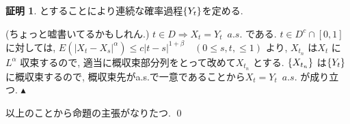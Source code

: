 \documentclass[10pt, fleqn, label-section=none]{bxjsarticle}
\theoremstyle{definition}
\newtheorem*{pf*}{証明}
\newcommand{\cbra}[1]{\mleft\{#1\mright\}}
\newcommand{\abs}[1]{\left|#1\right|}
\newcommand{\naraba}{\Rightarrow}
\renewcommand{\;}{\, ; \,}
\newenvironment{claim}[1]{\par\noindent\underline{step:}\space#1}{}
\newenvironment{claimproof}[1]{\par\noindent{($\because$)}\space#1}{\hfill $\blacktriangle $}
\begin{document}
\begin{pf*}
とすることにより連続な確率過程$\cbra{Y_t}$を定める.
\begin{claimproof}(ちょっと嘘書いてるかもしれん.)
$t \in D \naraba X_t = Y_t \,\,\, a.s.$ である. $t \in D^c \cap [0,1]$ に対しては, $E(\abs{X_t - X_s}^\alpha) \leq c \abs{t -s} ^{1 + \beta} \quad (0 \leq s,t, \leq 1)$ より, $X_{t_n}$ は$X_t$ に$L^\alpha$ 収束するので, 適当に概収束部分列をとって改めて$X_{t_n}$ とする. $\cbra{X_{t_n}}$ は$\cbra{Y_t}$ に概収束するので, 概収束先がa.s.で一意であることから$X_t = Y_t \,\,\, a.s.$ が成り立つ.
\end{claimproof} 

以上のことから命題の主張がなりたつ.
\qed
\end{pf*}
\end{document}
